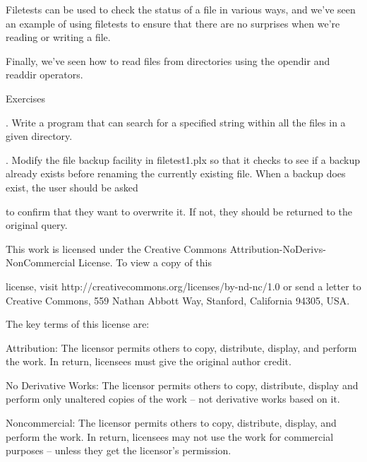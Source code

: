 \documentclass[a4paper,11pt]{book}
\begin{document}
\noindent 

\noindent Filetests can be used to check the status of a file in various ways, and we've seen an example of using filetests to ensure that there are no surprises when we're reading or writing a file.

\noindent 

\noindent Finally, we've seen how to read files from directories using the opendir and readdir operators.

\noindent 

\noindent 

\noindent Exercises

\noindent 

.   Write a program that can search for a specified string within all the files in a given directory.

\noindent 

.   Modify the file backup facility in filetest1.plx so that it checks to see if a backup already exists before renaming the currently existing file. When a backup does exist, the user should be asked

\noindent to confirm that they want to overwrite it. If not, they should be returned to the original query.

\noindent  

\noindent  

\noindent  

\noindent  

\noindent 

\noindent 

\noindent 

\noindent This work is licensed under the Creative Commons Attribution-NoDerivs-NonCommercial License. To view a copy of this

\noindent license, visit http://creativecommons.org/licenses/by-nd-nc/1.0 or send a letter to Creative Commons, 559 Nathan Abbott Way, Stanford, California 94305, USA.

\noindent 

\noindent The key terms of this license are:

\noindent 

\noindent Attribution: The licensor permits others to copy, distribute, display, and perform the work. In return, licensees must give the original author credit.

\noindent 

\noindent No  Derivative  Works: The licensor permits others to copy, distribute, display and perform only unaltered copies of the work -- not derivative works based on it.

\noindent 

\noindent Noncommercial: The licensor permits others to copy, distribute, display, and perform the work. In return, licensees may not use the work for commercial purposes -- unless they get the licensor's permission.
\end{document}
